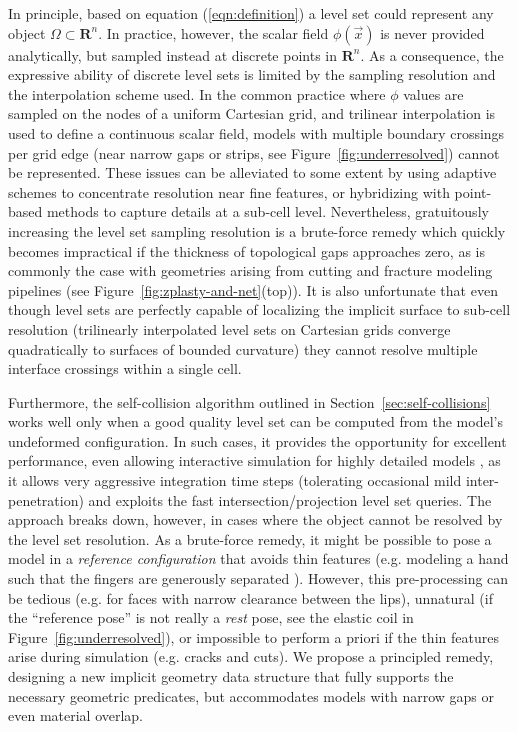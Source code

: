 In principle, based on equation (\ref{eqn:definition}) a level set
could represent any object $\Omega\subset\mathbf{R}^n$. In practice,
however, the scalar field $\phi(\vec{x})$ is never provided
analytically, but sampled instead at discrete points in
$\mathbf{R}^n$. As a consequence, the expressive ability of discrete
level sets is limited by the sampling resolution and the interpolation
scheme used. In the common practice where $\phi$ values are sampled on
the nodes of a uniform Cartesian grid, and trilinear interpolation is
used to define a continuous scalar field, models with multiple
boundary crossings per grid edge (near narrow gaps or strips, see
Figure~\ref{fig:underresolved}) cannot be represented. These issues
can be alleviated to some extent by using adaptive schemes
\cite{LosasGF:2004,Muset:2013} to concentrate resolution near fine
features, or hybridizing with point-based methods \cite{EnrigMF:2002}
to capture details at a sub-cell level. Nevertheless, gratuitously
increasing the level set sampling resolution is a brute-force remedy
which quickly becomes impractical if the thickness of topological gaps
approaches zero, as is commonly the case with geometries arising from
cutting and fracture modeling pipelines (see
Figure~\ref{fig:zplasty-and-net}(top)). It is also unfortunate that
even though level sets are perfectly capable of localizing the
implicit surface to sub-cell resolution (trilinearly interpolated
level sets on Cartesian grids converge quadratically to surfaces of
bounded curvature) they cannot resolve multiple interface crossings
within a single cell.

Furthermore, the self-collision algorithm outlined in
Section~\ref{sec:self-collisions} works well only when a good quality
level set can be computed from the model's undeformed
configuration. In such cases, it provides the opportunity for
excellent performance, even allowing interactive simulation for highly
detailed models \cite{McAdaZSETTS:2011}, as it allows very aggressive
integration time steps (tolerating occasional mild inter-penetration)
and exploits the fast intersection/projection level set queries. The
approach breaks down, however, in cases where the object cannot be
resolved by the level set resolution. As a brute-force remedy, it might be
possible to pose a model in a \emph{reference configuration} that
avoids thin features (e.g. modeling a hand such that the fingers are
generously separated \cite{McAdaZSETTS:2011}). However, this
pre-processing can be tedious (e.g. for faces with narrow clearance
between the lips), unnatural (if the ``reference pose'' is not really
a \emph{rest} pose, see the elastic coil in
Figure~\ref{fig:underresolved}), or impossible to perform a priori if
the thin features arise during simulation (e.g. cracks and cuts). We
propose a principled remedy, designing a new implicit geometry data
structure that fully supports the necessary geometric predicates, but
accommodates models with narrow gaps or even material overlap.

